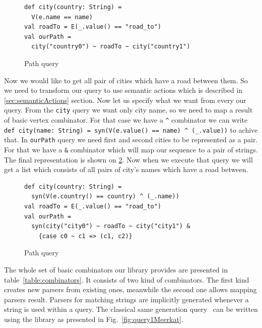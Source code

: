 \begin{figure}[h]
\begin{lstlisting}
def city(country: String) =
  V(e.name == name)
val roadTo = E(_.value() == "road_to")
val ourPath = 
  city("country0") ~ roadTo ~ city("country1")
\end{lstlisting}
\caption{Path query}
\label{fig:simpleQuery}
\end{figure}



Now we would like to get all pair of cities which have a road between them. 
So we need to transform our query to use semantic actions which is described in \ref{sec:semanticActions} section. 
Now let us specify what we want from every our query. 
From the \lstinline{city} query we want only city name, so we need to map a result of basic vertex combinator. 
For that case we have a \lstinline{^} combinator we can write \lstinline{def city(name: String) = syn(V(e.value() == name) ^ (_.value))} to achive that. 
In \lstinline{ourPath} query we need first and second cities to be represented as a pair. 
For that we have a \lstinline{&} combinator which will map our sequence to a pair of strings.
The final representation is shown on \ref{fig:simpleQueryV2}. 
Now when we execute that query we will get a list which consists of all pairs of city's names which have a road between.

\begin{figure}[h]
\begin{lstlisting}
def city(country: String) =
  syn(V(e.country() == country) ^ (_.name))
val roadTo = E(_.value() == "road_to")
val ourPath = 
  syn(city("city0") ~ roadTo ~ city("city1") &
    {case c0 ~ c1 => (c1, c2)}
\end{lstlisting}
\caption{Path query}
\label{fig:simpleQueryV2}
\end{figure}


The whole set of basic combinators our library provides are presented in table~\ref{table:combinators}. 
It consists of two kind of combinators. The first kind creates new parsers from existing ones, meanwhile the second one allows mapping parsers result.
Parsers for matching strings are implicitly generated whenever a string is used within a query. 
The classical same generation query~\cite{FndDB} can be written using the library as presented in Fig.~\ref{fig:query1Meerkat}.



